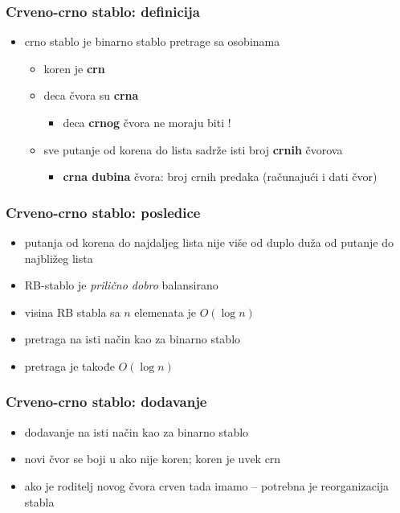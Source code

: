 \documentclass[compress,aspectratio=169]{beamer}
\begin{document}
\begin{frame}[fragile]
  \frametitle{Crveno-crno stablo: definicija}
  \begin{itemize}
    \item {}crno stablo je binarno stablo pretrage sa osobinama
    \begin{itemize}
      \item koren je \textbf{crn}
      \item deca \textbf{} čvora su \textbf{crna}
      \begin{itemize}
        \item deca \textbf{crnog} čvora ne moraju biti \textbf{}!
      \end{itemize}
      \item sve putanje od korena do lista sadrže isti broj \textbf{crnih} čvorova
      \begin{itemize}
        \item \textbf{crna dubina} čvora: broj crnih predaka (računajući i dati čvor)
      \end{itemize}
    \end{itemize}
  \end{itemize}
\end{frame}

\begin{frame}[fragile]
  \frametitle{Crveno-crno stablo: posledice}
  \begin{itemize}
    \item putanja od korena do najdaljeg lista nije više od duplo duža od putanje do najbližeg lista
    \item RB-stablo je \textit{prilično dobro} balansirano
    \item visina RB stabla sa $n$ elemenata je $O(\log n)$
    \item pretraga na isti način kao za binarno stablo
    \item pretraga je takođe $O(\log n)$
  \end{itemize}
\end{frame}

\begin{frame}[fragile]
  \frametitle{Crveno-crno stablo: dodavanje}
  \begin{itemize}
    \item dodavanje na isti način kao za binarno stablo 
    \item novi čvor se boji u  ako nije koren; koren je uvek crn
      \item ako je roditelj novog čvora crven tada imamo  -- potrebna je reorganizacija stabla
  \end{itemize}
\end{frame}
\end{document}
